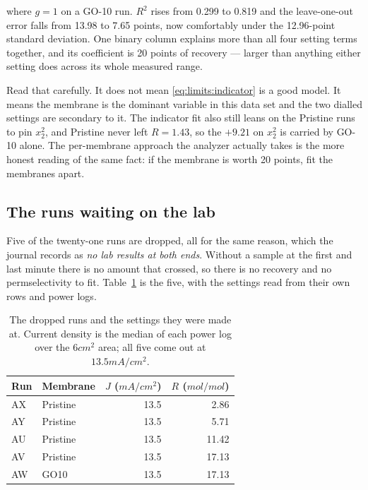 where $g = 1$ on a GO-10 run. $R^2$ rises from 0.299 to 0.819 and the leave-one-out error
falls from 13.98 to 7.65 points, now comfortably under the 12.96-point standard deviation.
One binary column explains more than all four setting terms together, and its coefficient
is 20 points of recovery --- larger than anything either setting does across its whole
measured range.

Read that carefully. It does not mean \eqref{eq:limits:indicator} is a good model. It
means the membrane is the dominant variable in this data set and the two dialled settings
are secondary to it. The indicator fit also still leans on the Pristine runs to pin
$x_2^2$, and Pristine never left $R = 1.43$, so the $+9.21$ on $x_2^2$ is carried by GO-10
alone. The per-membrane approach the analyzer actually takes is the more honest reading of
the same fact: if the membrane is worth 20 points, fit the membranes apart.

\subsection{The runs waiting on the lab}
\label{sec:limits:waiting}

Five of the twenty-one runs are dropped, all for the same reason, which the journal
records as \emph{no lab results at both ends}. Without a sample at the first and last
minute there is no amount that crossed, so there is no recovery and no permselectivity to
fit. Table~\ref{tab:limits:waiting} is the five, with the settings read from their own
rows and power logs.

\begin{table}[htbp]
  \centering
  \caption{The dropped runs and the settings they were made at. Current density is the
    median of each power log over the $6\unit{cm^2}$ area; all five come out at
    $13.5\unit{mA/cm^2}$.}
  \label{tab:limits:waiting}
  \begin{tabular}{l l r r}
    \toprule
    Run & Membrane & $J$ ($\unit{mA/cm^2}$) & $R$ ($\unit{mol/mol}$) \\
    \midrule
    AX & Pristine & 13.5 & 2.86 \\
    AY & Pristine & 13.5 & 5.71 \\
    AU & Pristine & 13.5 & 11.42 \\
    AV & Pristine & 13.5 & 17.13 \\
    AW & GO10     & 13.5 & 17.13 \\
    \bottomrule
  \end{tabular}
\end{table}

